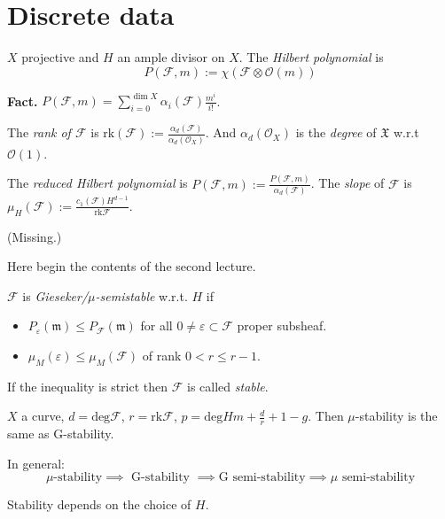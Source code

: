\section{Discrete data}
\label{section-discrete-data}

$X$ projective and $H$ an ample divisor on $X$. The {\it Hilbert polynomial} is
$$
P(\mathcal{F},m):=\chi(\mathcal{F}\otimes \mathcal{O}(m))
$$

\medskip\noindent
{\bf Fact.} $P(\mathcal{F},m)=\sum_{i=0}^{\dim
X}\alpha_i(\mathcal{F})\frac{m^i}{i!}$.

The {\it rank of $\mathcal{F}$} is
$\text{rk}(\mathcal{F}):=\frac{\alpha_d(\mathcal{F})}{\alpha_d(\mathcal{O}_X)}$.
And $\alpha_d(\mathcal{O}_X)$ is the {\it degree} of $\mathfrak{X}$ w.r.t
$\mathcal{O}(1)$.

The {\it reduced Hilbert polynomial} is
$P(\mathcal{F},m):=\frac{P(\mathcal{F},m)}{\alpha_d(\mathcal{F})}$. The {\it
slope} of $\mathcal{F}$ is
$\mu_H(\mathcal{F}):=\frac{c_1(\mathcal{F})H^{d-1}}{\text{rk}\mathcal{F}}$.

\begin{example}
\label{example-curve-of-genus-g-using-Riemann-Roch}
(Missing.)
\end{example}

\medskip\noindent
Here begin the contents of the second lecture.
\begin{definition}
\label{definition-Gieseker-and-mu-stability}
$\mathcal{F}$ is {\it Gieseker/$\mu$-semistable} w.r.t. $H$ if
\begin{itemize}
\item $P_\varepsilon(\mathfrak{m})\leq P_{\mathcal{F}}(\mathfrak{m})$ for all $0
\neq  \varepsilon \subset \mathcal{F}$ proper subsheaf.
\item $\mu_{M}(\varepsilon) \leq  \mu_{M}(\mathcal{F})$ of rank $0<r \leq r-1$.
\end{itemize}
If the inequality is strict then $\mathcal{F}$ is called {\it stable}.
\end{definition}

\begin{example}
\label{example-G-and-mu-stability-coincide-in-curve}
$X$ a curve, $d=\text{deg}\mathcal{F}$, $r=\text{rk}\mathcal{F}$,
$p=\text{deg}Hm+\frac{d}{r}+1-g$. Then $\mu$-stability is the same as
G-stability.
\end{example}
In general:
$$
\mu\text{-stability}\implies \text{ G-stability }\implies \text{G semi-stability
}\implies \mu \text{ semi-stability}
$$
\begin{remark}
\label{remark-stability-depends-on-H}
Stability depends on the choice of $H$.
\end{remark}


